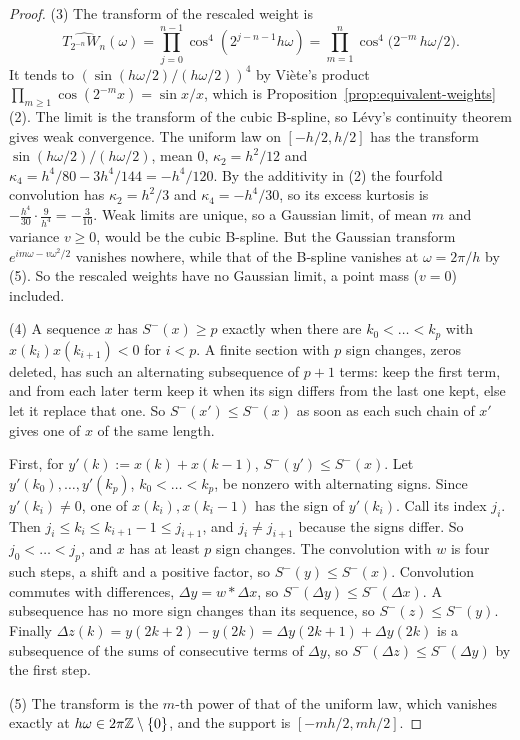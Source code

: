 \begin{proof}
(3) The transform of the rescaled weight is
\[
  \widehat{T_{2^{-n}}W_n}(\omega) = \prod_{j=0}^{n-1}\cos^4(2^{j-n-1}h\omega)
  = \prod_{m=1}^{n}\cos^4\bigl(2^{-m}\,h\omega/2\bigr).
\]
It tends to $(\sin(h\omega/2)/(h\omega/2))^4$ by Viète's product
$\prod_{m \ge 1}\cos(2^{-m}x) = \sin x/x$, which is Proposition~\ref{prop:equivalent-weights}(2). The
limit is the transform of the cubic B-spline, so Lévy's continuity theorem gives weak convergence.
The uniform law on $[-h/2,h/2]$ has the transform $\sin(h\omega/2)/(h\omega/2)$, mean $0$,
$\kappa_2 = h^2/12$ and $\kappa_4 = h^4/80 - 3h^4/144 = -h^4/120$. By the additivity in (2) the
fourfold convolution has $\kappa_2 = h^2/3$ and $\kappa_4 = -h^4/30$, so its excess kurtosis is
$-\tfrac{h^4}{30}\cdot\tfrac{9}{h^4} = -\tfrac3{10}$. Weak limits are unique, so a Gaussian limit,
of mean $m$ and variance $v \ge 0$, would be the cubic B-spline. But the Gaussian transform
$e^{im\omega - v\omega^2/2}$ vanishes nowhere, while that of the B-spline vanishes at
$\omega = 2\pi/h$ by (5). So the rescaled weights have no Gaussian limit, a point mass ($v = 0$)
included.

(4) A sequence $x$ has $S^-(x) \ge p$ exactly when there are $k_0 < \dots < k_p$ with
$x(k_i)x(k_{i+1}) < 0$ for $i < p$. A finite section with $p$ sign changes, zeros deleted, has such
an alternating subsequence of $p + 1$ terms: keep the first term, and from each later term keep
it when its sign differs from the last one kept, else let it replace that one. So
$S^-(x') \le S^-(x)$ as soon as each such chain of $x'$ gives one of $x$ of the same length.

First, for $y'(k) := x(k) + x(k-1)$, $S^-(y') \le S^-(x)$. Let
$y'(k_0), \dots, y'(k_p)$, $k_0 < \dots < k_p$, be nonzero with alternating signs. Since
$y'(k_i) \ne 0$, one of $x(k_i), x(k_i - 1)$ has the sign of $y'(k_i)$. Call its index $j_i$. Then
$j_i \le k_i \le k_{i+1} - 1 \le j_{i+1}$, and $j_i \ne j_{i+1}$ because the signs differ. So
$j_0 < \dots < j_p$, and $x$ has at least $p$ sign changes. The convolution with $w$ is four such
steps, a shift and a positive factor, so $S^-(y) \le S^-(x)$. Convolution commutes with
differences, $\Delta y = w * \Delta x$, so $S^-(\Delta y) \le S^-(\Delta x)$. A subsequence has no
more sign changes than its sequence, so $S^-(z) \le S^-(y)$. Finally
$\Delta z(k) = y(2k+2) - y(2k) = \Delta y(2k+1) + \Delta y(2k)$ is a subsequence of the sums of
consecutive terms of $\Delta y$, so $S^-(\Delta z) \le S^-(\Delta y)$ by the first step.

(5) The transform is the $m$-th power of that of the uniform law, which vanishes exactly at
$h\omega \in 2\pi\mathbb{Z} \setminus \{0\}$, and the support is $[-mh/2, mh/2]$.
\end{proof}

